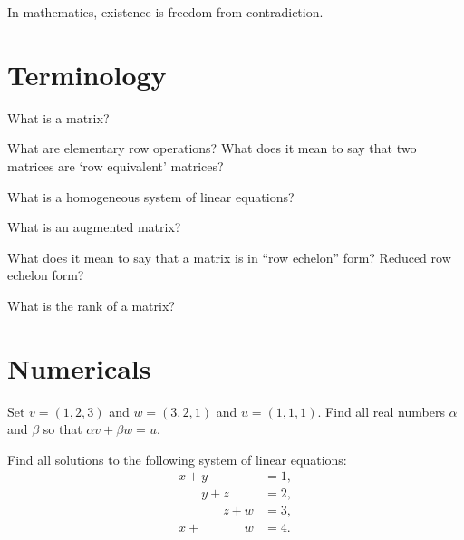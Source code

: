 \documentclass{homework}
\author{Jim Fowler}
\begin{document}
\maketitle

\begin{inspiration}
In mathematics, existence is freedom from contradiction.
\end{inspiration}

\section{Terminology}

\begin{problem}\label{terminology:matrix}
  What is a matrix?
\end{problem}

\begin{problem}
  What are elementary row operations?  What does it mean to say that
  two matrices are `row equivalent' matrices?
\end{problem}

\begin{problem}\label{homogeneous-linear-equations}
  What is a homogeneous system of linear equations?
\end{problem}

\begin{problem}
  What is an augmented matrix?
\end{problem}

\begin{problem}
  What does it mean to say that a matrix is in ``row echelon'' form?  Reduced row echelon form?
\end{problem}

\begin{problem}\label{definition-rank}
  What is the rank of a matrix?
\end{problem}

\section{Numericals}

\begin{problem}
  Set $v = (1,2,3)$ and $w = (3,2,1)$ and $u = (1,1,1)$.  Find all real
  numbers $\alpha$ and $\beta$ so that $\alpha v + \beta w = u$.
\end{problem}

\begin{problem}
  Find all solutions to the following system of linear equations:
  \begin{align*}
    \phantom{}x+y\phantom{+z+w} &= 1, \\
    \phantom{x+}y+z\phantom{+w} &= 2, \\
    \phantom{x+y+}z+w\phantom{} &= 3, \\
    x+\phantom{y+z+}w\phantom{} &= 4.
  \end{align*}
\end{problem}
\end{document}
